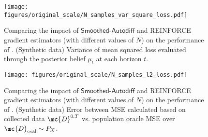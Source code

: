 \begin{figure}[t]
\centering
\begin{minipage}[b]{0.49\textwidth}
\centering
\texttt{[image: figures/original\_scale/N\_samples\_var\_square\_loss.pdf]}
\caption{Comparing the impact of $\mathsf{Smoothed\text{-}Autodiff}$ and \textsf{REINFORCE} gradient estimators (with different values of $N$) on the performance of  \ouralgo. (Synthetic data) Variance of mean squared loss evaluated through the posterior belief $\mu_t$ at each horizon $t$.}
\label{fig:var-l2-sim-in-N}
\end{minipage}
\hfill
\begin{minipage}[b]{0.49\textwidth}
\centering \texttt{[image: figures/original\_scale/N\_samples\_l2\_loss.pdf]}
\caption{Comparing the impact of $\mathsf{Smoothed\text{-}Autodiff}$ and \textsf{REINFORCE} gradient estimators (with different values of $N$) on the performance of  \ouralgo. (Synthetic data) Error between MSE calculated based on collected data $\mc{D}^{0:T}$ vs. population oracle MSE over $\mc{D}_{\rm eval} \sim P_X$.}
\label{fig:mean-l2-sim-N}
\end{minipage}
\end{figure}



